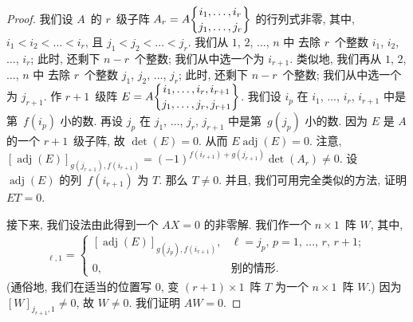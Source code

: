 \documentclass[../libro.tex]{subfiles}
\begin{document}
\begin{proof}
    我们设 \(A\)~的 \(r\)~级子阵
    \(A_r = A\submat{i_1,\dots,i_r}{j_1,\dots,j_r}\)
    的行列式非零,
    其中, \(i_1 < i_2 < \dots < i_r\),
    且 \(j_1 < j_2 < \dots < j_r\).
    我们从 \(1\), \(2\), \(\dots\), \(n\) 中%
    去除 \(r\)~个整数
    \(i_1\), \(i_2\), \(\dots\), \(i_r\);
    此时, 还剩下 \(n-r\)~个整数;
    我们从中选一个为 \(i_{r+1}\).
    类似地,
    我们再从 \(1\), \(2\), \(\dots\), \(n\) 中%
    去除 \(r\)~个整数
    \(j_1\), \(j_2\), \(\dots\), \(j_r\);
    此时, 还剩下 \(n-r\)~个整数;
    我们从中选一个为 \(j_{r+1}\).
    作 \(r+1\)~级阵
    \(
        E =
        A\submat{i_1,\dots,i_r,i_{r+1}}
        {j_1,\dots,j_r,j_{r+1}}
    \).
    我们设 \(i_p\) 在
    \(i_1\), \(\dots\), \(i_r\), \(i_{r+1}\)
    中是第~\(f(i_p)\) 小的数.
    再设 \(j_p\) 在
    \(j_1\), \(\dots\), \(j_r\), \(j_{r+1}\)
    中是第~\(g(j_p)\) 小的数.
    因为 \(E\) 是 \(A\) 的一个 \(r+1\)~级子阵,
    故 \(\det {(E)} = 0\).
    从而
    \(E \operatorname{adj} {(E)} = 0\).
    注意,
    \([\operatorname{adj} {(E)}]_{g(j_{r+1}), f(i_{r+1})}
    = (-1)^{f(i_{r+1})+g(j_{r+1})} \det {(A_r)} \neq 0\).
    设 \(\operatorname{adj} {(E)}\)
    的列~\(f(i_{r+1})\) 为 \(T\).
    那么 \(T \neq 0\).
    并且, 我们可用完全类似的方法, 证明
    \(ET = 0\).

    接下来, 我们设法由此得到一个 \(AX = 0\)
    的非零解.
    我们作一个 \(n \times 1\)~阵 \(W\), 其中,
    \begin{align*}
        [W]_{\ell,1} =
        \begin{cases}
            [\operatorname{adj} {(E)}]_{g(j_p),f(i_{r+1})},
            & \text{\(\ell = j_p\),
            \(p = 1\), \(\dots\), \(r\), \(r+1\)}; \\
            0, & \text{别的情形}.
        \end{cases}
    \end{align*}
    (通俗地, 我们在适当的位置写 \(0\), %
    变 \((r+1) \times 1\)~阵 \(T\)
    为一个 \(n \times 1\)~阵 \(W\).) %
    因为 \([W]_{j_{r+1},1} \neq 0\),
    故 \(W \neq 0\).
    我们证明 \(AW = 0\).


\end{proof}
\end{document}

